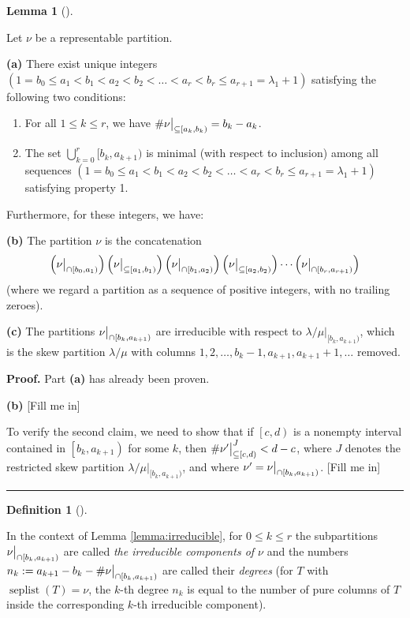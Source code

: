 \documentclass[numbers=enddot,12pt,final,onecolumn,notitlepage]{scrartcl}%
\theoremstyle{definition}
\newtheorem{lem}[theo]{Lemma}
\newenvironment{lemma}[1][]
{\begin{lem}[#1]\begin{leftbar}}
{\end{leftbar}\end{lem}}
\newtheorem{defi}[theo]{Definition}
\newenvironment{definition}[1][]
{\begin{defi}[#1]\begin{leftbar}}
{\end{leftbar}\end{defi}}
\newtheorem{remk}[theo]{Remark}
\newenvironment{remark}[1][]
{\begin{remk}[#1]\begin{leftbar}}
{\end{leftbar}\end{remk}}
\newenvironment{proof}[1][Proof]{\noindent\textbf{#1.} }{\ \rule{0.5em}{0.5em}}
\def\seplist{{\operatorname*{seplist}}} %
\def\seplistvar{{{\nu}}} %
\def\lm{{\lambda/\mu}}
\begin{document}
\begin{lemma}
\label{lemma:irreducible}
 Let $\seplistvar$ be a representable partition.

\textbf{(a)} There exist unique integers $(1=b_0\leq a_1<b_1<a_2<b_2<\dots<a_r<b_r\leq a_{r+1}=\lambda_1+1)$ satisfying the following two conditions:
 \begin{enumerate}
  \item For all $1\leq k\leq r$, we have $\#\nuxy{a_k}{b_k} =b_k-a_k$.
  \item The set $\bigcup_{k=0}^{r}[b_k,a_{k+1})$ is minimal (with respect to inclusion) among all sequences $(1=b_0\leq a_1<b_1<a_2<b_2<\dots<a_r<b_r\leq a_{r+1}=\lambda_1+1)$ satisfying property 1.
 \end{enumerate}

Furthermore, for these integers, we have:

\textbf{(b)} The partition $\nu$ is the concatenation
\[
\left(\nuxycap{b_0}{a_1}\right) \left(\nuxy{a_1}{b_1}\right) \left(\nuxycap{b_1}{a_2}\right) \left(\nuxy{a_2}{b_2}\right) \cdots \left(\nuxycap{b_r}{a_{r+1}}\right)
\]
(where we regard a partition as a sequence of positive integers, with no trailing zeroes).

\textbf{(c)} The partitions $\nuxycap{b_k}{a_{k+1}}$ are irreducible with respect to $\lm\big|_{[b_k,a_{k+1})}$,
 which is the skew partition $\lm$ with columns $1,2,\dots,b_k-1,a_{k+1},a_{k+1}+1,\dots$ removed.
\end{lemma}

\begin{proof}
Part \textbf{(a)} has already been proven.

\textbf{(b)} [Fill me in]

To verify the second claim, we need to show that if $\left[c,d\right)$ is a nonempty interval contained in $\left[b_k, a_{k+1}\right)$ for some $k$, then $\#\nupxy{c}{d}^{J} < d-c$, where $J$ denotes the restricted skew partition $\lm\big|_{[b_k,a_{k+1})}$, and where $\seplistvar^{\prime} = \nuxycap{b_k}{a_{k+1}}$.
[Fill me in]
\end{proof}

\begin{definition}
 
 In the context of Lemma \ref{lemma:irreducible}, for $0\leq k\leq r$ the subpartitions $\nuxycap{b_k}{a_{k+1}}$ are called \textit{the irreducible components of $\seplistvar$} and the numbers $n_k:=a_{k+1}-b_k-\#\nuxycap{b_k}{a_{k+1}}$ are called their \textit{degrees}  (for $T$ with $\seplist(T)=\seplistvar$, the $k$-th degree $n_k$ is equal to the number of pure columns of $T$ inside the corresponding $k$-th irreducible component).
\end{definition}
\end{document}

